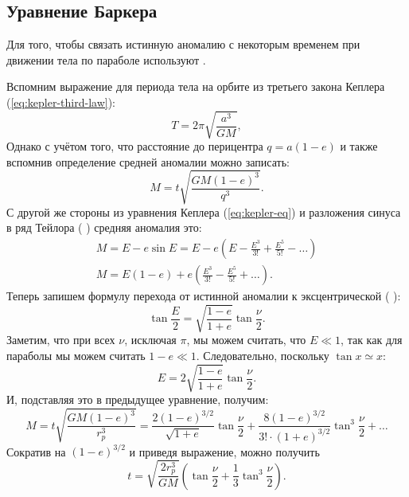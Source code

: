 \subsection{Уравнение Баркера}
Для того, чтобы связать истинную аномалию с некоторым временем при движении тела по параболе используют .

Вспомним выражение для периода тела на орбите из третьего закона Кеплера (\ref{eq:kepler-third-law}):
\begin{equation*}
	T = 2\pi \sqrt{\frac{a^3}{GM}},
\end{equation*}
Однако с учётом того, что расстояние до перицентра  $q = a(1-e)$ и также вспомнив определение средней аномалии можно записать:
\begin{equation*}
	M=t \sqrt{\frac{GM(1-e)^3}{q^3}}.
\end{equation*}
С другой же стороны из уравнения Кеплера (\ref{eq:kepler-eq}) и разложения синуса в ряд Тейлора (%
) средняя аномалия это:
\begin{gather*}
	M=E - e \sin E = E - e \left(E - \frac{E^3}{3!} + \frac{E^5}{5!} - \dots\right) \\
	M = E(1-e) + e\left(\frac{E^3}{3!} - \frac{E^5}{5!} + \dots \right).
\end{gather*}
Теперь запишем формулу перехода от истинной аномалии к эксцентрической (%
):
\begin{equation*}
	\tan \frac{E}{2} = \sqrt{\frac{1-e}{1+e}} \tan \frac{\nu}{2}.
\end{equation*}
Заметим, что при всех $\nu$, исключая $\pi$, мы можем считать, что $E \ll 1$, так как для параболы мы можем считать $1-e \ll 1$. Следовательно, поскольку $\tan x \simeq x$:
\begin{equation*}
	E = 2 \sqrt{\frac{1-e}{1+e}} \tan \frac{\nu}{2}.
\end{equation*}
И, подставляя это в предыдущее уравнение, получим:
\begin{equation*}
	M = t \sqrt{\frac{GM(1-e)^3}{r_{p}^3}} = \frac{2(1-e)^{3/2}}{\sqrt{1+e}}\tan\frac{\nu}{2} + \frac{8(1-e)^{3/2}}{3! \cdot (1+e)^{3/2}}\tan^3 \frac{\nu}{2} + \dots
\end{equation*}
Сократив на $(1-e)^{3/2}$ и приведя выражение, можно получить 
\begin{equation}
	t = \sqrt{\frac{2r_{p}^3}{GM}}\left(\tan \frac{\nu}{2 } + \frac{1}{3}\tan^3 \frac{\nu}{2}\right).
\end{equation}